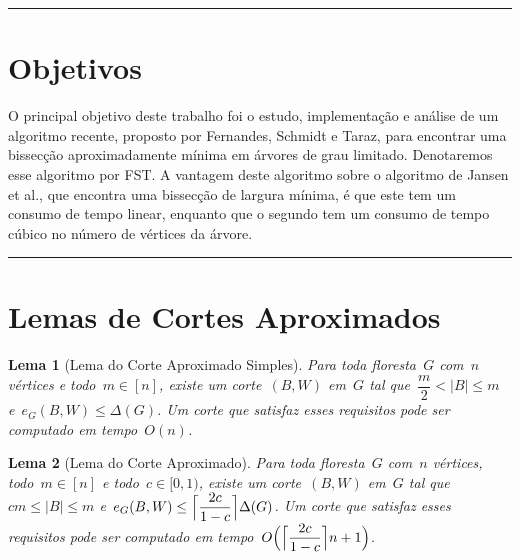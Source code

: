 \documentclass[a0,portrait]{a0poster}
\DeclarePairedDelimiter\ceil{\lceil}{\rceil}
\newtheorem{lem}{Lema}
\begin{document}
\begin{multicols}{3}
\noindent\rule[0.5ex]{\linewidth}{1pt}



\color{Black} %


\section*{Objetivos}

    O principal objetivo deste trabalho foi o estudo, implementação e 
    análise de um algoritmo recente, proposto por Fernandes, Schmidt e 
    Taraz, para encontrar uma bissecção 
    aproximadamente mínima em árvores de grau limitado. Denotaremos
    esse algoritmo por FST. 
    A vantagem deste algoritmo sobre o algoritmo de Jansen et 
    al., que encontra uma bissecção de largura 
    mínima, é que este tem um consumo de tempo linear, enquanto que o 
    segundo tem um consumo de tempo cúbico no número de vértices da 
    árvore. 

\noindent\rule[0.5ex]{\linewidth}{1pt}


\section* {Lemas de Cortes Aproximados}

\begin{lem}[Lema do Corte Aproximado Simples]
	Para toda floresta~$G$ com~$n$ vértices e todo~${m \in [n]}$,
	existe um corte~$(B,W)$ em~$G$ tal 
	que~${\dfrac{m}{2} <|B| \le m}$ e~${e_G(B,W) \le \Delta(G)}$.
	Um corte que satisfaz esses requisitos pode ser computado em
	tempo~$O(n)$.
\end{lem}

\medskip

\begin{lem}[Lema do Corte Aproximado]
	Para toda floresta~$G$ com~$n$ vértices, todo~${m \in [n]}$ e 
	todo~${c \in [0,1)}$, existe um corte~$(B,W)$ em~$G$ tal 
	que~${cm \le |B| \le m}$ 
	e~${e_G(B,W) \le \ceil[\Big]{ \dfrac{2c}{1-c}} \Delta(G)}$.
	Um corte que satisfaz esses requisitos pode ser computado em
	tempo~$O{\Big(\ceil[\Big]{ \dfrac{2c}{1-c}} n+1\Big)}$.
\end{lem}


\end{multicols}
\end{document}
